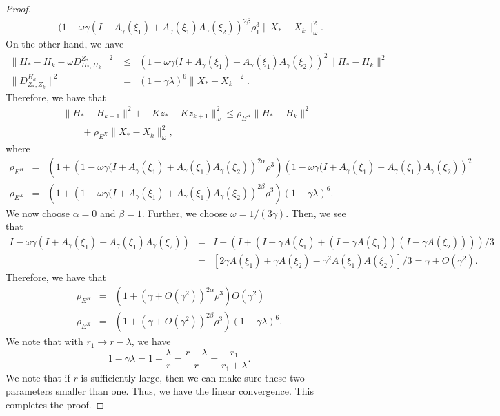 \begin{proof}
\begin{eqnarray*}
&& + (1 - \omega \gamma (I +  A_\gamma(\xi_1) + A_\gamma (\xi_1)A_\gamma(\xi_2))^{2\beta} \rho_1^3 \|X_* - X_k\|_\omega^2. 
\end{eqnarray*}
On the other hand, we have 
\begin{eqnarray*}
\|H_* - H_k - \omega D_{H_*,H_k}^{Z_*} \|^2 &\leq& 
\left (1 - \omega \gamma (I +  A_\gamma(\xi_1) + A_\gamma (\xi_1)A_\gamma(\xi_2) \right )^{2} \|H_* - H_k\|^2 \\ 
\|D_{Z_*,Z_k}^{H_k}\|^2 &=& (1 - \gamma \lambda)^6 \|X_* - X_k\|^2.   
\end{eqnarray*}
Therefore, we have that 
\begin{eqnarray*}
&& \|H_{*} - H_{k+1}\|^2 + \|Kz_* - Kz_{k+1}\|^2_{\omega} \leq \rho_{E^H} \|H_* - H_k\|^2  \\
&& \qquad + \rho_{E^X} \|X_* - X_k\|_{\omega}^2, 
\end{eqnarray*}
where 
\begin{eqnarray*}
\rho_{E^H} &=& \left ( 1 + \left ( 1 - \omega \gamma (I +  A_\gamma(\xi_1) + A_\gamma (\xi_1)A_\gamma(\xi_2) \right )^{2\alpha} \rho^3 \right ) \left ( 1 - \omega \gamma (I +  A_\gamma(\xi_1) + A_\gamma (\xi_1)A_\gamma(\xi_2) \right )^{2} \\
\rho_{E^X} &=& \left ( 1 + \left ( 1 - \omega \gamma (I +  A_\gamma(\xi_1) + A_\gamma (\xi_1)A_\gamma(\xi_2) \right )^{2\beta} \rho^3 \right ) (1 - \gamma \lambda)^6. 
\end{eqnarray*}
We now choose $\alpha = 0$ and $\beta = 1$. Further, we choose $\omega = 1/(3\gamma)$. Then, we see that 
\begin{eqnarray*}
I - \omega \gamma (I + A_\gamma(\xi_1) + A_\gamma (\xi_1) A_\gamma(\xi_2)) &=& I - (I + (I - \gamma A(\xi_1) + (I - \gamma A(\xi_1))(I - \gamma A(\xi_2))))/3  \\
&=& [2\gamma A(\xi_1) + \gamma A(\xi_2) - \gamma^2 A(\xi_1) A(\xi_2)]/3 = \gamma + O(\gamma^2). 
\end{eqnarray*}
Therefore, we have that 
\begin{eqnarray*}
\rho_{E^H} &=& \left ( 1 + (\gamma + O(\gamma^2))^{2\alpha} \rho^3 \right )  O(\gamma^2) \\
\rho_{E^X} &=& \left ( 1 + (\gamma + O(\gamma^2))^{2\beta} \rho^3 \right ) (1 - \gamma \lambda)^6. 
\end{eqnarray*}
We note that with $r_1 \rightarrow r - \lambda$, we have 
\begin{equation} 
1 - \gamma \lambda = 1 - \frac{\lambda}{r} = \frac{r - \lambda}{r} = \frac{r_1}{r_1 + \lambda}. 
\end{equation} 
We note that if $r$ is sufficiently large, then we can make sure these two parameters smaller than one. Thus, we have the linear convergence.  This completes the proof. 
\end{proof}



